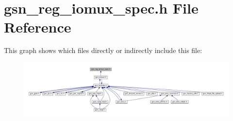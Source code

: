 \hypertarget{a00560}{
\section{gsn\_\-reg\_\-iomux\_\-spec.h File Reference}
\label{a00560}
}
This graph shows which files directly or indirectly include this file:
\nopagebreak
\begin{figure}[H]
\begin{center}
\leavevmode
\includegraphics[width=400pt]{a00796}
\end{center}
\end{figure}
